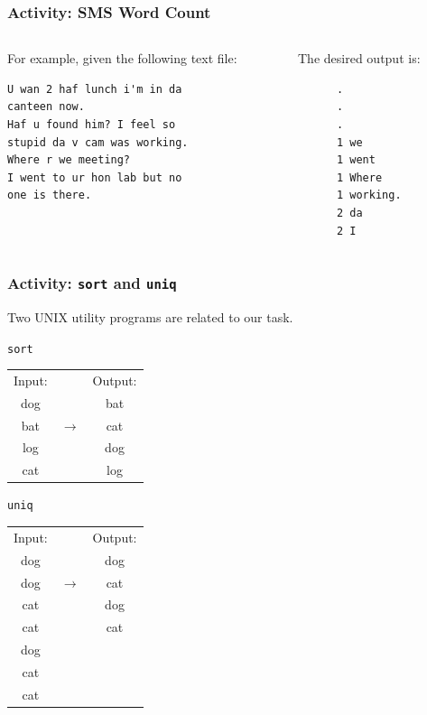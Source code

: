 \documentclass[a4paper]{beamer}
\newcommand{\ftitle}[1]{\frametitle<presentation>{#1}}
\begin{document}
\begin{frame}[fragile]
\ftitle{Activity: SMS Word Count}
\begin{columns}
\begin{column}{0.5\textwidth}
For example, given the following text file:
\begin{verbatim}
U wan 2 haf lunch i'm in da 
canteen now.
Haf u found him? I feel so 
stupid da v cam was working.
Where r we meeting?
I went to ur hon lab but no 
one is there.
\end{verbatim}
\end{column}
\begin{column}{0.5\textwidth}
The desired output is:
\begin{verbatim}
      .
      .
      .
      1 we
      1 went
      1 Where
      1 working.
      2 da
      2 I
\end{verbatim}
\end{column}
\end{columns}
\end{frame}


\begin{frame}[fragile]
\frametitle{Activity: \texttt{sort} and \texttt{uniq}}
Two UNIX utility programs are related to our task.  

\begin{block}{\texttt{sort}}
\begin{tabular}{c c c}
Input: & & Output: \\
dog    & & bat \\
bat    &$\longrightarrow$& cat \\
log    & & dog \\
cat    & & log \\
\end{tabular}
\end{block}

\begin{block}{\texttt{uniq}}
\begin{tabular}{c c c}
Input: & & Output: \\
dog    & & dog \\
dog    &$\longrightarrow$& cat \\
cat    & & dog \\
cat    & & cat \\
dog    & & \\
cat    & & \\
cat    & & \\
\end{tabular}
\end{block}
\end{frame}
\end{document}
